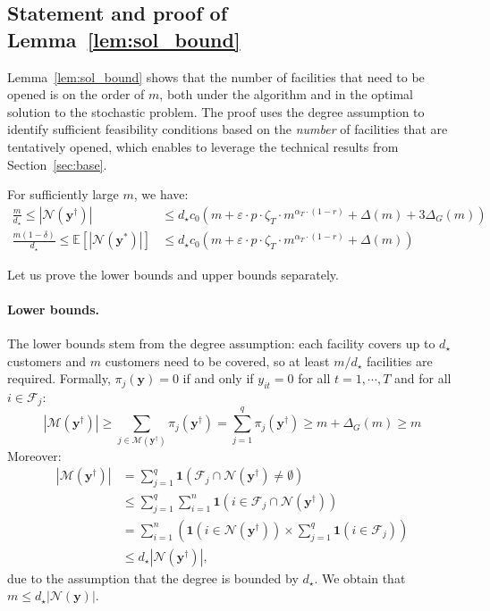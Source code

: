 \documentclass[nonblindrev]{informs3noheader}
\def\E{\mathbb{E}}
\def\calF{\mathcal{F}}
\def\calM{\mathcal{M}}
\def\calN{\mathcal{N}}
\def\by{\boldsymbol{y}}
\def\bone{\boldsymbol{1}}
\begin{document}
\subsection{Statement and proof of Lemma~\ref{lem:sol_bound}}

Lemma~\ref{lem:sol_bound} shows that the number of facilities that need to be opened is on the order of $m$, both under the algorithm and in the optimal solution to the stochastic problem. The proof uses the degree assumption to identify sufficient feasibility conditions based on the \textit{number} of facilities that are tentatively opened, which enables to leverage the technical results from Section~\ref{sec:base}.

\begin{lemma}\label{lem:sol_bound}
    For sufficiently large $m$, we have:
    \begin{align*}
        \frac{m}{d_\star} \leq |\calN(\by^\dagger)|&\leq  d_\star c_0\left(m + \varepsilon\cdot p \cdot \zeta_T\cdot m^{\alpha_T\cdot(1-r)} +\Delta(m)+3\Delta_G(m)\right)\\
        \frac{m(1-\delta)}{d_\star} \leq \E[|\calN(\by^*)|]&\leq   d_\star c_0\left(m + \varepsilon\cdot p \cdot \zeta_T\cdot m^{\alpha_T\cdot(1-r)} + \Delta(m)\right)      
    \end{align*}
\end{lemma}

 Let us prove the lower bounds and upper bounds separately.

\paragraph{Lower bounds.}

The lower bounds stem from the degree assumption: each facility covers up to $d_\star$ customers and $m$ customers need to be covered, so at least $m/d_\star$ facilities are required. Formally, $\pi_{j}(\by)=0$ if and only if $y_{it}=0$ for all $t=1,\cdots,T$ and for all $i\in\calF_j$:
$$|\calM(\by^\dagger)|\geq\sum_{j\in\calM(\by^\dagger)}\pi_{j}(\by^\dagger)=\sum_{j=1}^q \pi_{j}(\by^\dagger) \geq m+\Delta_G(m)\geq m$$
Moreover:
\begin{align*}
    |\calM(\by^\dagger)|
    &=\sum_{j=1}^q\bone(\calF_j\cap\calN(\by^\dagger)\neq\emptyset)\\
    &\leq \sum_{j=1}^q\sum_{i=1}^n\bone(i\in\calF_j\cap\calN(\by^\dagger))\\
    &=\sum_{i=1}^n\left(\bone\left(i\in\calN(\by^\dagger)\right)\times\sum_{j=1}^q\bone(i\in\calF_j)\right)\\
    &\leq d_\star|\calN(\by^\dagger)|,
\end{align*}
due to the assumption that the degree is bounded by $d_\star$. We obtain that
$m\leq d_\star|\calN(\by)|$.
\end{document}
